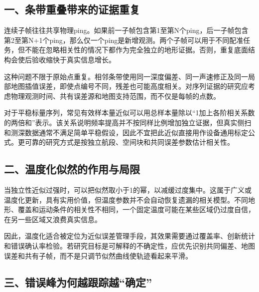 \hypertarget{ux4e00ux6761ux5e26ux91cdux53e0ux5e26ux6765ux7684ux8bc1ux636eux91cdux590d}{%
\subsection{一、条带重叠带来的证据重复}\label{ux4e00ux6761ux5e26ux91cdux53e0ux5e26ux6765ux7684ux8bc1ux636eux91cdux590d}}

连续子帧往往共享物理ping。如果前一子帧包含第1至第N个ping，后一子帧包含第2至第N+1个ping，那么仅一个ping是新增观测。两个子帧可以用于不同配准任务，但不能在忽略相关性的情况下都作为完全独立的地形证据。否则，重复底面结构会使后验收缩快于真实信息增长。

这种问题不限于原始点重复。相邻条带使用同一深度偏差、同一声速修正及同一局部地图插值误差，即使点编号不同，残差也可能高度相关。对序列证据的研究应考虑物理观测时间、共有误差源和地图支持范围，而不仅是每帧的点数。

对于平稳标量序列，常见有效样本量近似可以用总样本量除以``1加上各阶相关系数的两倍和''表示。该关系说明频率提高并不按同样比例增加独立证据，但真实侧扫和测深数据通常不满足简单平稳假设，因此不宜把此近似直接用作设备通用标定公式。更可靠的研究方式是按独立航段、空间块和共同误差参数估计相关性。

\hypertarget{ux4e8cux6e29ux5ea6ux5316ux4f3cux7136ux7684ux4f5cux7528ux4e0eux5c40ux9650}{%
\subsection{二、温度化似然的作用与局限}\label{ux4e8cux6e29ux5ea6ux5316ux4f3cux7136ux7684ux4f5cux7528ux4e0eux5c40ux9650}}

当独立性近似过强时，可以把似然取小于1的幂，以减缓过度集中。这属于广义或温度化更新，具有实用价值，但温度参数并不会自动恢复遗漏的相关模型。不同地形、覆盖和运动条件的相关性不相同，一个固定温度可能在某些区域仍过度自信，在另一些区域又浪费真实信息。

因此，温度化适合被定位为近似误差管理手段，其效果需要通过覆盖率、创新统计和错误确认率检验。若研究目标是可解释的不确定性，应优先识别共同偏差、地图误差和共有子帧，而不是只调节似然曲线使轨迹看起来平滑。

\hypertarget{ux4e09ux9519ux8befux5cf0ux4e3aux4f55ux8d8aux8ddfux8e2aux8d8aux786eux5b9a}{%
\subsection{三、错误峰为何越跟踪越``确定''}\label{ux4e09ux9519ux8befux5cf0ux4e3aux4f55ux8d8aux8ddfux8e2aux8d8aux786eux5b9a}}

